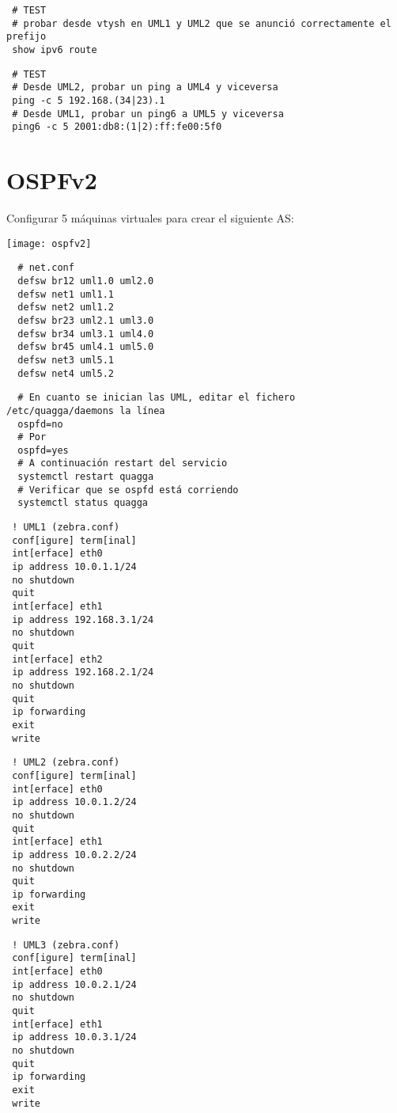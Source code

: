 \documentclass{article}
\begin{document}
\begin{verbatim}
 # TEST
 # probar desde vtysh en UML1 y UML2 que se anunció correctamente el prefijo
 show ipv6 route
\end{verbatim}

\begin{verbatim}
 # TEST
 # Desde UML2, probar un ping a UML4 y viceversa
 ping -c 5 192.168.(34|23).1
 # Desde UML1, probar un ping6 a UML5 y viceversa
 ping6 -c 5 2001:db8:(1|2):ff:fe00:5f0
\end{verbatim}


\section{OSPFv2}

Configurar 5 máquinas virtuales para crear el siguiente AS:

\texttt{[image: ospfv2]}

\begin{verbatim}
  # net.conf
  defsw br12 uml1.0 uml2.0
  defsw net1 uml1.1
  defsw net2 uml1.2
  defsw br23 uml2.1 uml3.0
  defsw br34 uml3.1 uml4.0
  defsw br45 uml4.1 uml5.0
  defsw net3 uml5.1
  defsw net4 uml5.2 
\end{verbatim}

\begin{verbatim}
  # En cuanto se inician las UML, editar el fichero /etc/quagga/daemons la línea
  ospfd=no
  # Por
  ospfd=yes
  # A continuación restart del servicio
  systemctl restart quagga
  # Verificar que se ospfd está corriendo
  systemctl status quagga
\end{verbatim}

\begin{verbatim}
 ! UML1 (zebra.conf)
 conf[igure] term[inal]
 int[erface] eth0
 ip address 10.0.1.1/24
 no shutdown
 quit
 int[erface] eth1
 ip address 192.168.3.1/24
 no shutdown
 quit
 int[erface] eth2
 ip address 192.168.2.1/24
 no shutdown
 quit
 ip forwarding
 exit
 write
\end{verbatim}
\begin{verbatim}
 ! UML2 (zebra.conf)
 conf[igure] term[inal]
 int[erface] eth0
 ip address 10.0.1.2/24
 no shutdown
 quit
 int[erface] eth1
 ip address 10.0.2.2/24
 no shutdown
 quit
 ip forwarding
 exit
 write
\end{verbatim}

\begin{verbatim}
 ! UML3 (zebra.conf)
 conf[igure] term[inal]
 int[erface] eth0
 ip address 10.0.2.1/24
 no shutdown
 quit
 int[erface] eth1
 ip address 10.0.3.1/24
 no shutdown
 quit
 ip forwarding
 exit
 write
\end{verbatim}
\end{document}
